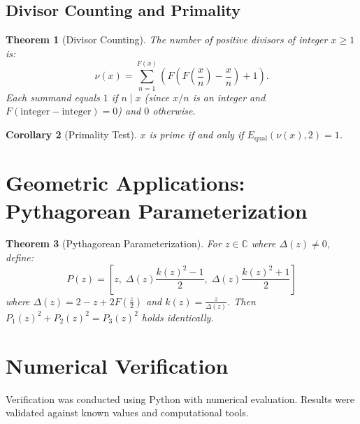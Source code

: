 \documentclass[12pt, a4paper]{article}
\theoremstyle{note}
\newtheorem{theorem}{Theorem}[section]
\newtheorem{corollary}[theorem]{Corollary}
\newcommand{\Complex}{\mathbb{C}}
\begin{document}
\subsection{Divisor Counting and Primality}

\begin{theorem}[Divisor Counting]\label{thm:factors}
The number of positive divisors of integer $x \geq 1$ is:
\[
\nu(x) = \sum_{n=1}^{F(x)} \left(F\!\left(F\!\left(\frac{x}{n}\right) - \frac{x}{n}\right) + 1\right).
\]
Each summand equals $1$ if $n \mid x$ (since $x/n$ is an integer and $F(\text{integer} - \text{integer}) = 0$) and $0$ otherwise.
\end{theorem}

\begin{corollary}[Primality Test]\label{cor:prime}
$x$ is prime if and only if $E_{\operatorname{qual}}(\nu(x), 2) = 1$.
\end{corollary}

\section{Geometric Applications: Pythagorean Parameterization}
\label{sec:pythag}

\begin{theorem}[Pythagorean Parameterization]\label{thm:pythag}
For $z \in \Complex$ where $\Delta(z) \neq 0$, define:
\[
P(z) = \left[z, \; \Delta(z)\frac{k(z)^2-1}{2}, \; \Delta(z)\frac{k(z)^2+1}{2}\right]
 \]
where $\Delta(z) = 2 - z + 2F\!\left(\frac{z}{2}\right)$ and $k(z) = \frac{z}{\Delta(z)}$.
Then $P_1(z)^2 + P_2(z)^2 = P_3(z)^2$ holds identically.
\end{theorem}

\section{Numerical Verification}
\label{sec:verification}

Verification was conducted using Python with numerical evaluation. Results were validated against known values and computational tools.
\end{document}
